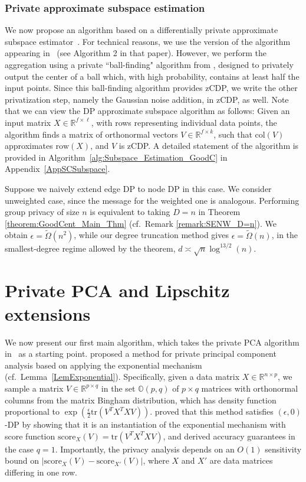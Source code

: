 \documentclass{article}
\newcommand{\real}{\mathbb{R}}
\begin{document}

\subsubsection{Private approximate subspace estimation}

We now propose an algorithm based on a differentially private approximate subspace estimator~\cite{SinSte21, KamEtal22}. For technical reasons, we use the version of the algorithm appearing in~\cite{KamEtal22} (see Algorithm 2 in that paper). However, we perform the aggregation using a private ``ball-finding" algorithm from \cite{mahpud2022differentially}, designed to privately output the center of a ball which, with high probability, contains at least half the input points. Since this ball-finding algorithm provides zCDP, we write the other privatization step, namely the Gaussian noise addition, in zCDP, as well. Note that we can view the DP approximate subspace algorithm as follows: Given an input matrix $X \in \real^{f \times \ell}$, with rows representing individual data points, the algorithm finds a matrix of orthonormal vectors $V \in \real^{f \times k}$, such that $\text{col}(V)$ approximates $\text{row}(X)$, and $V$ is zCDP. A detailed statement of the algorithm is provided in Algorithm~\ref{alg:Subspace_Estimation_GoodC} in Appendix~\ref{AppSCSubspace}.

Suppose we naively extend edge DP to node DP in this case. We consider unweighted case, since the message for the weighted one is analogous. Performing group privacy of size $n$ is equivalent to taking $D = n$ in Theorem \ref{theorem:GoodCent_Main_Thm} (cf.\ Remark \ref{remark:SENW_D=n}). We obtain $\epsilon = \widetilde{\Omega}(n^2)$, while our degree truncation method gives $\epsilon=\widetilde{\Omega}(n)$, in the smallest-degree regime allowed by the theorem, $d \asymp \sqrt{n}\log^{13/2}(n)$.


\section{Private PCA and Lipschitz extensions}
\label{SecPPCA}

We now present our first main algorithm, which takes the private PCA algorithm in~\cite{ChaEtal13} as a starting point. \cite{ChaEtal13} proposed a method for private principal component analysis based on applying the exponential mechanism (cf.\ Lemma~\ref{LemExponential}). Specifically, given a data matrix $X \in \real^{n \times p}$, we sample a matrix $V \in \real^{p \times q}$ in the set $\mathbb{O}(p,q)$ of $p\times q$ matrices with orthonormal columns from the matrix Bingham distribution, which has density function proportional to $\exp\left(\frac{\epsilon}{2} \text{tr}(V^T X^TX V)\right)$. \cite{ChaEtal13} proved that this method satisfies $(\epsilon, 0)$-DP by showing that it is an instantiation of the exponential mechanism
with score function $\text{score}_X(V) = \text{tr}(V^TX^TX V)$, and derived accuracy guarantees in the case $q=1$. Importantly, the privacy analysis depends on an $O(1)$ sensitivity bound on $|\text{score}_X(V) - \text{score}_{X'}(V)|$, where $X$ and $X'$ are data matrices differing in one row.
\end{document}
